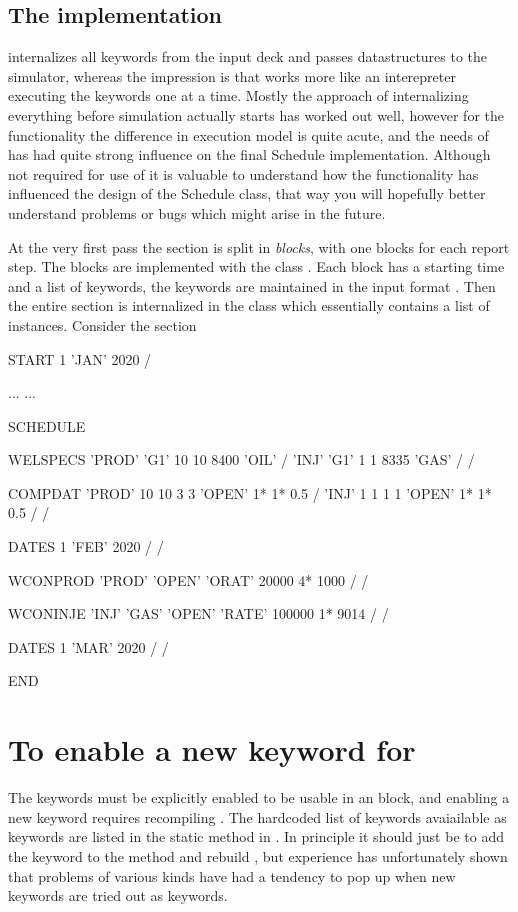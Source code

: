 \subsection*{The  implementation}
\flow{} internalizes all keywords from the input deck and passes datastructures
to the simulator, whereas the impression is that \eclipse{} works more like an
interepreter executing the keywords one at a time. Mostly the \flow{} approach
of internalizing everything before simulation actually starts has worked out
well, however for the \actionx{} functionality the difference in execution model
is quite acute, and the needs of \actionx{} has had quite strong influence on
the final Schedule implementation. Although not required for use of \actionx{}
it is valuable to understand how the \actionx{} functionality has influenced the
design of the Schedule class, that way you will hopefully better understand
problems or bugs which might arise in the future.

At the very first pass the  section is split in \emph{blocks}, with
one blocks for each report step. The blocks are implemented with the class
. Each block has a starting time and a list of
keywords, the keywords are maintained in the input format
. Then the entire  section is internalized
in the class  which essentially contains a list of
 instances. Consider the  section
\begin{deck}
START
  1 'JAN' 2020 /

...
...

SCHEDULE

WELSPECS
	'PROD'	'G1'	10	10	8400	'OIL' /
	'INJ'	'G1'	1	1	8335	'GAS' /
/

COMPDAT
	'PROD'	10	10	3	3	'OPEN'	1*	1*	0.5 /
	'INJ'	1	1	1	1	'OPEN'	1*	1*	0.5 /
/

DATES
   1 'FEB' 2020 /
/

WCONPROD
	'PROD' 'OPEN' 'ORAT' 20000 4* 1000 /
/

WCONINJE
	'INJ'	'GAS'	'OPEN'	'RATE'	100000 1* 9014 /
/

DATES
  1 'MAR' 2020 /
/

END

\end{deck}


\section{To enable a new keyword for \actionx}
The keywords must be explicitly enabled to be usable in an \actionx{} block, and
enabling a new keyword requires recompiling \flow{}. The hardcoded list of
keywords avaiailable as \actionx{} keywords are listed in the static method
 in
. In principle it should
just be to add the keyword to the  method
and rebuild \flow{}, but experience has unfortunately shown that problems of
various kinds have had a tendency to pop up when new keywords are tried out as
\actionx{} keywords.


